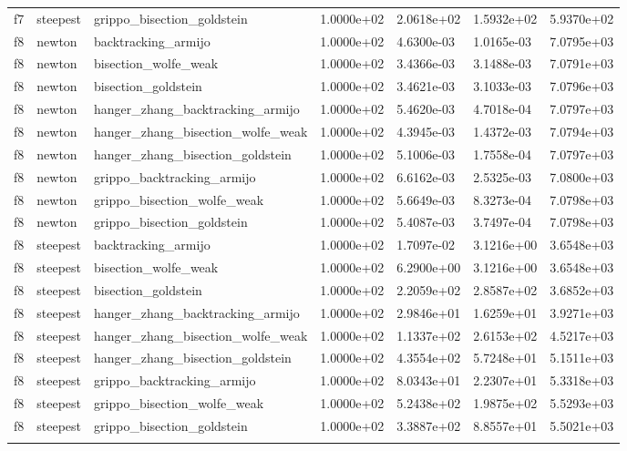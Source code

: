 \documentclass[a4paper,11pt]{article}
\numberwithin{equation}{section} %
\begin{document}
\begin{longtable}{p{1.5cm}|p{1.5cm}|p{4cm}|p{2cm}|p{2cm}|p{2cm}|p{2cm}}
        f7 & steepest & grippo\_bisection\_goldstein & 1.0000e+02 & 2.0618e+02 & 1.5932e+02 & 5.9370e+02 \\
        f8 & newton & backtracking\_armijo & 1.0000e+02 & 4.6300e-03 & 1.0165e-03 & 7.0795e+03 \\
        f8 & newton & bisection\_wolfe\_weak & 1.0000e+02 & 3.4366e-03 & 3.1488e-03 & 7.0791e+03 \\
        f8 & newton & bisection\_goldstein & 1.0000e+02 & 3.4621e-03 & 3.1033e-03 & 7.0796e+03 \\
        f8 & newton & hanger\_zhang\_backtracking\_armijo & 1.0000e+02 & 5.4620e-03 & 4.7018e-04 & 7.0797e+03 \\
        f8 & newton & hanger\_zhang\_bisection\_wolfe\_weak & 1.0000e+02 & 4.3945e-03 & 1.4372e-03 & 7.0794e+03 \\
        f8 & newton & hanger\_zhang\_bisection\_goldstein & 1.0000e+02 & 5.1006e-03 & 1.7558e-04 & 7.0797e+03 \\
        f8 & newton & grippo\_backtracking\_armijo & 1.0000e+02 & 6.6162e-03 & 2.5325e-03 & 7.0800e+03 \\
        f8 & newton & grippo\_bisection\_wolfe\_weak & 1.0000e+02 & 5.6649e-03 & 8.3273e-04 & 7.0798e+03 \\
        f8 & newton & grippo\_bisection\_goldstein & 1.0000e+02 & 5.4087e-03 & 3.7497e-04 & 7.0798e+03 \\
        f8 & steepest & backtracking\_armijo & 1.0000e+02 & 1.7097e-02 & 3.1216e+00 & 3.6548e+03 \\
        f8 & steepest & bisection\_wolfe\_weak & 1.0000e+02 & 6.2900e+00 & 3.1216e+00 & 3.6548e+03 \\
        f8 & steepest & bisection\_goldstein & 1.0000e+02 & 2.2059e+02 & 2.8587e+02 & 3.6852e+03 \\
        f8 & steepest & hanger\_zhang\_backtracking\_armijo & 1.0000e+02 & 2.9846e+01 & 1.6259e+01 & 3.9271e+03 \\
        f8 & steepest & hanger\_zhang\_bisection\_wolfe\_weak & 1.0000e+02 & 1.1337e+02 & 2.6153e+02 & 4.5217e+03 \\
        f8 & steepest & hanger\_zhang\_bisection\_goldstein & 1.0000e+02 & 4.3554e+02 & 5.7248e+01 & 5.1511e+03 \\
        f8 & steepest & grippo\_backtracking\_armijo & 1.0000e+02 & 8.0343e+01 & 2.2307e+01 & 5.3318e+03 \\
        f8 & steepest & grippo\_bisection\_wolfe\_weak & 1.0000e+02 & 5.2438e+02 & 1.9875e+02 & 5.5293e+03 \\
        f8 & steepest & grippo\_bisection\_goldstein & 1.0000e+02 & 3.3887e+02 & 8.8557e+01 & 5.5021e+03 \\
        \label{table:simulation2}
\end{longtable}








\end{document}
